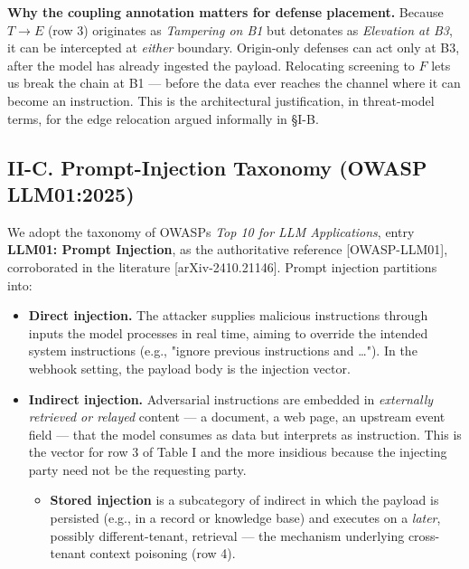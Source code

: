 \textbf{Why the coupling annotation matters for defense placement.}
Because \(T\!\rightarrow\!E\) (row 3) originates as \emph{Tampering on
B1} but detonates as \emph{Elevation at B3}, it can be intercepted at
\emph{either} boundary. Origin-only defenses can act only at B3, after
the model has already ingested the payload. Relocating screening to
\(F\) lets us break the chain at B1 --- before the data ever reaches the
channel where it can become an instruction. This is the architectural
justification, in threat-model terms, for the edge relocation argued
informally in §I-B.

\subsection{II-C. Prompt-Injection Taxonomy (OWASP
LLM01:2025)}\label{ii-c-prompt-injection-taxonomy-owasp-llm012025}

We adopt the taxonomy of OWASP\textquotesingle s \emph{Top 10 for LLM
Applications}, entry \textbf{LLM01: Prompt Injection}, as the
authoritative reference {[}OWASP-LLM01{]}, corroborated in the
literature {[}arXiv-2410.21146{]}. Prompt injection partitions into:

\begin{itemize}
\tightlist
\item
  \textbf{Direct injection.} The attacker supplies malicious
  instructions through inputs the model processes in real time, aiming
  to override the intended system instructions (e.g., "ignore previous
  instructions and \ldots"). In the webhook setting, the payload body is
  the injection vector.
\item
  \textbf{Indirect injection.} Adversarial instructions are embedded in
  \emph{externally retrieved or relayed} content --- a document, a web
  page, an upstream event field --- that the model consumes as data but
  interprets as instruction. This is the vector for row 3 of Table I and
  the more insidious because the injecting party need not be the
  requesting party.

  \begin{itemize}
  \tightlist
  \item
    \textbf{Stored injection} is a subcategory of indirect in which the
    payload is persisted (e.g., in a record or knowledge base) and
    executes on a \emph{later}, possibly different-tenant, retrieval ---
    the mechanism underlying cross-tenant context poisoning (row 4).
  \end{itemize}
\end{itemize}

